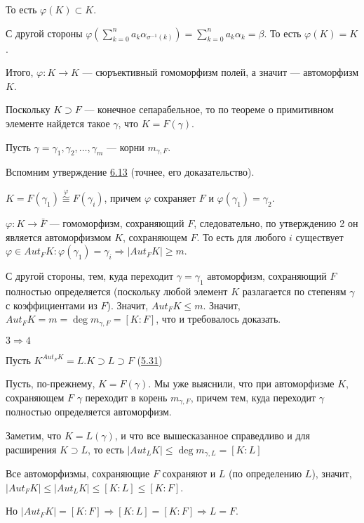 \begin{solution}
То есть \(\varphi(K) \subset K\).

С другой стороны \(\varphi(\sum\limits_{k = 0}^n a_k \alpha_{\sigma^{-1}(k)}) = \sum\limits_{k = 0}^n a_k \alpha_k = \beta\). То есть \(\varphi(K) = K\).

Итого, \(\varphi:K \to K\) --- сюръективный гомоморфизм полей, а значит --- автоморфизм \(K\).

Поскольку \(K \supset F\) --- конечное сепарабельное, то по теореме о примитивном элементе найдется такое \(\gamma\), что \(K = F(\gamma)\).

Пусть \(\gamma = \gamma_1, \gamma_2, \ldots, \gamma_m\) --- корни \(m_{\gamma, F}\).

Вспомним утверждение \hyperlink{6.13}{6.13} (точнее, его доказательство).

\(K = F(\gamma_1) \stackrel{\varphi}{\cong} F(\gamma_i)\), причем \(\varphi\) сохраняет \(F\) и \(\varphi(\gamma_1) = \gamma_2\).

\(\varphi: K \to \bar{F}\) --- гомоморфизм, сохраняющий \(F\), следовательно, по утверждению 2 он является автоморфизмом \(K\), сохраняющем \(F\). То есть для любого \(i\) существует \(\varphi \in Aut_FK: \varphi(\gamma_1) = \gamma_i \Rightarrow |Aut_FK| \geqslant m\).

С другой стороны, тем, куда переходит \(\gamma = \gamma_1\) автоморфизм, сохраняющий \(F\) полностью определяется (поскольку любой элемент \(K\) разлагается по степеням \(\gamma\) с коэффициентами из \(F\)). Значит, \(Aut_FK \leqslant m\). Значит, \(Aut_FK = m = \deg m_{\gamma, F} = [K : F]\), что и требовалось доказать.

\(3 \Rightarrow 4\)

Пусть \(K^{Aut_FK} = L. K \supset L \supset F\) (\hyperlink{5.31}{5.31})

Пусть, по-прежнему, \(K = F(\gamma)\). Мы уже выяснили, что при автоморфизме \(K\), сохраняющем \(F\) \(\gamma\) переходит в корень \(m_{\gamma, F}\), причем тем, куда переходит \(\gamma\) полностью определяется автоморфизм.

Заметим, что \(K = L(\gamma)\), и что все вышесказанное справедливо и для расширения \(K \supset L\), то есть \(|Aut_LK| \leqslant \deg m_{\gamma, L} = [K : L]\)

Все автоморфизмы, сохраняющие \(F\) сохраняют и \(L\) (по определению \(L\)), значит, \(|Aut_FK| \leqslant |Aut_LK| \leqslant [K : L] \leqslant [K : F]\).

Но \(|Aut_FK| = [K : F] \Rightarrow [K : L] = [K : F] \Rightarrow L = F\).


\end{solution}
